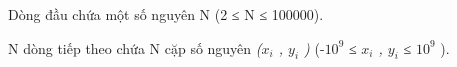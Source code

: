 Dòng đầu chứa một số nguyên       N      (2 ≤       N      ≤ 100000).  

       N      dòng tiếp theo chứa       N      cặp số nguyên   \textit{    ($x_{i}$    , $y_{i}$    )   }   (-$10^{9}$   ≤   \textit{    $x_{i}$    , $y_{i}$}   ≤ $10^{9}$   ).